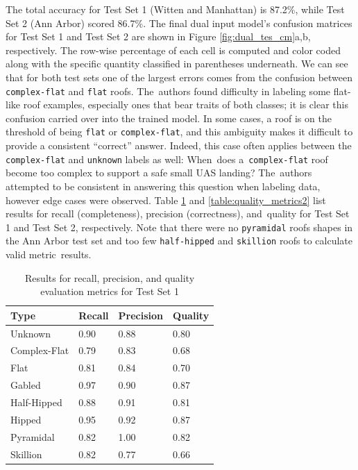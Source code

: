 The total accuracy for Test Set     1 (Witten and Manhattan) is 87.2\%, while Test Set     2 (Ann Arbor)  scored 86.7\%. The final dual input model's confusion matrices for Test Set     1 and Test Set     2 are shown in Figure \ref{fig:dual_tes_cm}a,b, respectively. The row-wise percentage of each cell is computed and color coded along with the specific quantity classified in parentheses underneath.  We can see that for both test sets one of the largest errors comes from the confusion between \texttt{complex-flat} and \texttt{flat} roofs. The~authors found difficulty in labeling some flat-like roof examples, especially ones that bear traits of both classes; it is clear this confusion carried over into the trained model. In some cases, a roof is on the threshold of being \texttt{flat} or \texttt{complex-flat}, and this ambiguity makes it difficult to provide a consistent ``correct'' answer.  Indeed, this case often applies between the \texttt{complex-flat} and \texttt{unknown} labels as well:  When~does a~\texttt{complex-flat} roof become too complex to support a safe small UAS landing? The~authors attempted to be consistent in answering this question when labeling data, however edge cases were observed. Table \ref{table:quality_metrics1} and \ref{table:quality_metrics2}  list  results for recall (completeness), precision (correctness), and~quality for Test Set     1 and Test Set     2, respectively. Note that there were no \texttt{pyramidal} roofs shapes in the Ann Arbor test set and too few \texttt{half-hipped} and \texttt{skillion} roofs to calculate valid metric~results. %

\begin{table}[H]
    \caption{Results for recall, precision, and quality evaluation metrics for Test Set 1}
    \label{table:quality_metrics1}
      \centering
      \begin{tabular}{llll}
        \toprule
       \textbf{ Type}        & \textbf{Recall} & \textbf{Precision} & \textbf{Quality} \\ \midrule
        Unknown     & 0.90   & 0.88  & 0.80  \\
        Complex-Flat& 0.79  & 0.83  & 0.68  \\
        Flat        & 0.81   & 0.84  & 0.70 \\
        Gabled      & 0.97   & 0.90  & 0.87  \\
        Half-Hipped & 0.88   & 0.91  & 0.81  \\
        Hipped      & 0.95   & 0.92  & 0.87  \\
        Pyramidal   & 0.82   & 1.00  & 0.82  \\
        Skillion    & 0.82   & 0.77  & 0.66  \\ 
        \bottomrule
        \end{tabular}
                  
\end{table}

